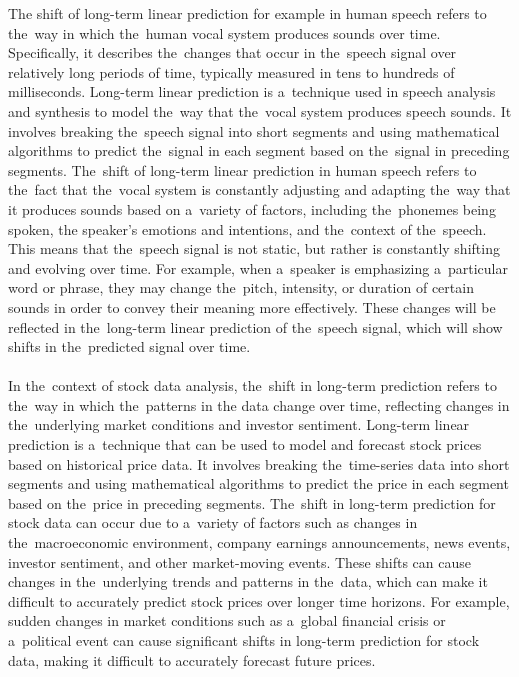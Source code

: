 The shift of long-term linear prediction for example in human speech refers to the~way in which the~human vocal system produces sounds over time.
Specifically, it describes the~changes that occur in the~speech signal over relatively long periods of time, typically
measured in tens to hundreds of milliseconds. Long-term linear prediction is a~technique used in speech analysis and
synthesis to model the~way that the~vocal system produces speech sounds. It involves breaking the~speech signal into
short segments and using mathematical algorithms to predict the~signal in each segment based on the~signal in preceding
segments. The~shift of long-term linear prediction in human speech refers to the~fact that the~vocal system is constantly
adjusting and adapting the~way that it produces sounds based on a~variety of factors, including the~phonemes being spoken,
the speaker's emotions and intentions, and the~context of the~speech. This means that the~speech signal is not static,
but rather is constantly shifting and evolving over time. For example, when a~speaker is emphasizing a~particular
word or phrase, they may change the~pitch, intensity, or duration of certain sounds in order to convey their meaning
more effectively. These changes will be reflected in the~long-term linear prediction of the~speech signal, which will
show shifts in the~predicted signal over time.\\
\\
In the~context of stock data analysis, the~shift in long-term prediction refers to the~way in which the~patterns in
the data change over time, reflecting changes in the~underlying market conditions and investor sentiment.
Long-term linear prediction is a~technique that can be used to model and forecast stock prices based on historical
price data. It involves breaking the~time-series data into short segments and using mathematical algorithms to predict
the price in each segment based on the~price in preceding segments. The~shift in long-term prediction for stock data
can occur due to a~variety of factors such as changes in the~macroeconomic environment, company earnings announcements,
news events, investor sentiment, and other market-moving events. These shifts can cause changes in the~underlying trends
and patterns in the~data, which can make it difficult to accurately predict stock prices over longer time horizons.
For example, sudden changes in market conditions such as a~global financial crisis or a~political event can cause
significant shifts in long-term prediction for stock data, making it difficult to accurately forecast future prices.
